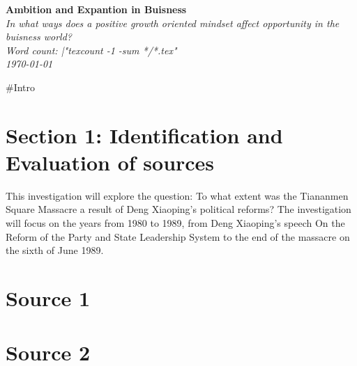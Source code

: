 \documentclass[letterpaper, 12pt]{article}
\author{Grant Lemons}
\date{\today}
\newcommand{\thetitle}{Ambition and Expantion in Buisness}
\newcommand{\researchquestion}{In what ways does a positive growth oriented mindset affect opportunity in the buisness world?}
\newcommand{\wordcount}{|"texcount -1 -sum */*.tex"}
\begin{document}
\begin{titlepage}
\begin{center}
\vspace*{6.3cm}
\textbf{\Huge \thetitle}\\
\textit{\researchquestion}\\
\vspace{2.5cm}
\textit{Word count: \wordcount}\\
\vspace{0.6cm}
\textit{\today}\\

\end{center}
\end{titlepage}


\newpage

#Intro
\section{Section 1: Identification and Evaluation of sources}
This investigation will explore the question: To what extent was the Tiananmen Square Massacre a result of Deng Xiaoping's political reforms? The investigation will focus on the years from 1980 to 1989, from Deng Xiaoping’s speech On the Reform of the Party and State Leadership System to the end of the massacre on the sixth of June 1989.

\section{Source 1}


\section{Source 2}

\end{document}
